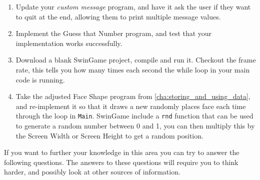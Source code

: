 \begin{enumerate}
  \item Update your \emph{custom message} program, and have it ask the user if they want to quit at the end, allowing them to print multiple message values.
  
  \item Implement the Guess that Number program, and test that your implementation works successfully.
  \item Download a blank SwinGame project, compile and run it. Checkout the frame rate, this tells you how many times each second the while loop in your main code is running.
  \item Take the adjusted Face Shape program from \cref{cha:storing_and_using_data}, and re-implement it so that it draws a new randomly places face each time through the loop in \texttt{Main}. SwinGame include a \texttt{rnd} function that can be used to generate a random number between 0 and 1, you can then multiply this by the Screen Width or Screen Height to get a random position.
\end{enumerate}
  
\clearpage

If you want to further your knowledge in this area you can try to answer the following questions. The answers to these questions will require you to think harder, and possibly look at other sources of information.


